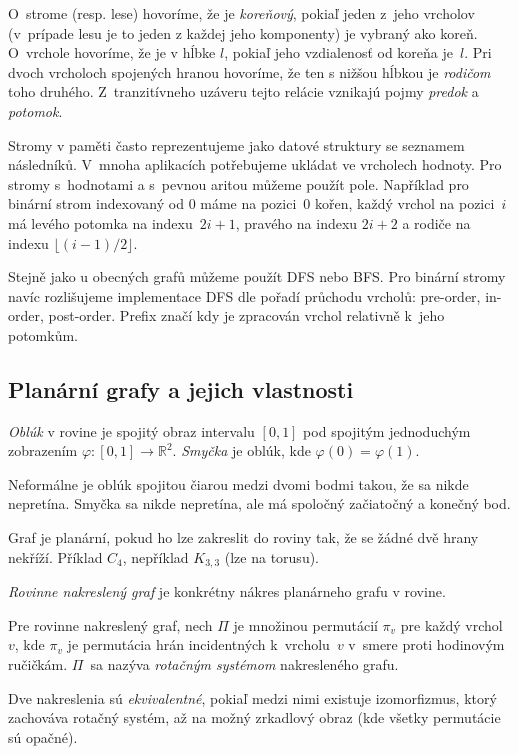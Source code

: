 O~strome (resp. lese) hovoríme, že je {\em koreňový}, pokiaľ jeden 
z~jeho vrcholov (v~prípade lesu je to jeden z každej jeho komponenty)
je vybraný ako koreň. O~vrchole hovoríme, že je v hĺbke $l$, pokiaľ 
jeho vzdialenosť od koreňa je~$l$. Pri dvoch vrcholoch spojených
hranou hovoríme, že ten s nižšou hĺbkou je {\em rodičom} toho druhého.
Z~tranzitívneho uzáveru tejto relácie vznikajú pojmy {\em predok} a 
{\em potomok}.

Stromy v paměti často reprezentujeme jako datové struktury se seznamem
následníků. V~mnoha aplikacích potřebujeme ukládat ve vrcholech hodnoty.
Pro stromy s~hodnotami a s~pevnou aritou můžeme použít pole.
Například pro binární strom indexovaný od 0 máme na pozici~$0$ kořen,
každý vrchol na pozici~$i$ má levého potomka na indexu~$2i+1$, pravého
na indexu $2i+2$ a rodiče na indexu $\lfloor (i - 1) / 2 \rfloor$.

Stejně jako u obecných grafů můžeme použít DFS nebo BFS. Pro binární
stromy navíc rozlišujeme implementace DFS dle pořadí průchodu vrcholů:
pre-order, in-order, post-order. Prefix značí kdy je zpracován vrchol
relativně k~jeho potomkům.

\subsection{Planární grafy a jejich vlastnosti}

\begin{definition}
	{\em Oblúk} v rovine je spojitý obraz intervalu $[0,1]$ pod spojitým
	jednoduchým zobrazením $\varphi: [0,1] \to \mathbb{R}^2$. 
	{\em Smyčka} je oblúk, kde $\varphi(0)=\varphi(1)$.
\end{definition}
Neformálne je oblúk spojitou čiarou medzi dvomi bodmi takou, že sa
nikde nepretína. Smyčka sa nikde nepretína, ale má spoločný začiatočný
a konečný bod.

Graf je planární, pokud ho lze zakreslit do roviny tak, že se žádné dvě
hrany nekříží. Příklad $C_4$, nepříklad $K_{3,3}$ (lze na torusu).

{\em Rovinne nakreslený graf} je konkrétny nákres planárneho grafu v rovine.

\begin{definition}
	Pre rovinne nakreslený graf, nech $\Pi$ je množinou permutácií $\pi_v$
	pre každý vrchol $v$, kde $\pi_v$ je permutácia hrán incidentných 
	k~vrcholu~$v$ v~smere proti hodinovým ručičkám. $\Pi$~sa nazýva {\em rotačným
	systémom} nakresleného grafu.
	
	Dve nakreslenia sú {\em ekvivalentné}, pokiaľ medzi nimi existuje izomorfizmus,
	ktorý zachováva rotačný systém, až na možný zrkadlový obraz (kde všetky permutácie
	sú opačné).
\end{definition}

